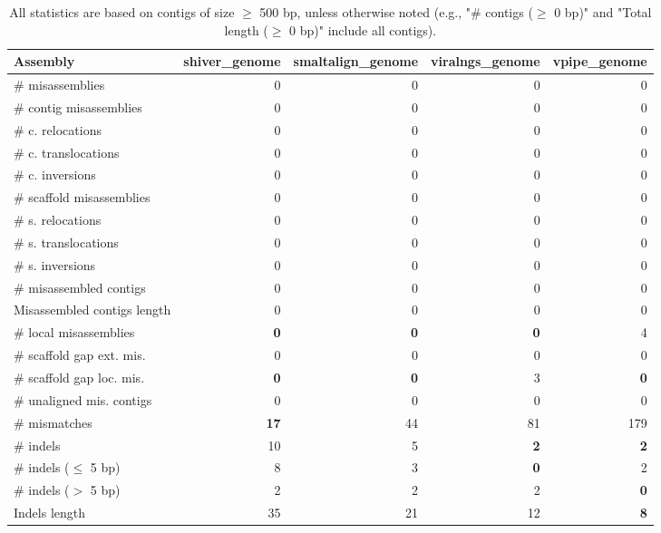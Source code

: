 \documentclass[12pt,a4paper]{article}
\begin{document}
\begin{table}[ht]
\begin{center}
\caption{All statistics are based on contigs of size $\geq$ 500 bp, unless otherwise noted (e.g., "\# contigs ($\geq$ 0 bp)" and "Total length ($\geq$ 0 bp)" include all contigs).}
\begin{tabular}{|l*{4}{|r}|}
\hline
Assembly & shiver\_genome & smaltalign\_genome & viralngs\_genome & vpipe\_genome \\ \hline
\# misassemblies & 0 & 0 & 0 & 0 \\ \hline
\hspace{2mm}\# contig misassemblies & 0 & 0 & 0 & 0 \\ \hline
\hspace{5mm}\# c. relocations & 0 & 0 & 0 & 0 \\ \hline
\hspace{5mm}\# c. translocations & 0 & 0 & 0 & 0 \\ \hline
\hspace{5mm}\# c. inversions & 0 & 0 & 0 & 0 \\ \hline
\hspace{2mm}\# scaffold misassemblies & 0 & 0 & 0 & 0 \\ \hline
\hspace{5mm}\# s. relocations & 0 & 0 & 0 & 0 \\ \hline
\hspace{5mm}\# s. translocations & 0 & 0 & 0 & 0 \\ \hline
\hspace{5mm}\# s. inversions & 0 & 0 & 0 & 0 \\ \hline
\# misassembled contigs & 0 & 0 & 0 & 0 \\ \hline
Misassembled contigs length & 0 & 0 & 0 & 0 \\ \hline
\# local misassemblies & {\bf 0} & {\bf 0} & {\bf 0} & 4 \\ \hline
\# scaffold gap ext. mis. & 0 & 0 & 0 & 0 \\ \hline
\# scaffold gap loc. mis. & {\bf 0} & {\bf 0} & 3 & {\bf 0} \\ \hline
\# unaligned mis. contigs & 0 & 0 & 0 & 0 \\ \hline
\# mismatches & {\bf 17} & 44 & 81 & 179 \\ \hline
\# indels & 10 & 5 & {\bf 2} & {\bf 2} \\ \hline
\hspace{5mm}\# indels ($\leq$ 5 bp) & 8 & 3 & {\bf 0} & 2 \\ \hline
\hspace{5mm}\# indels ($>$ 5 bp) & 2 & 2 & 2 & {\bf 0} \\ \hline
Indels length & 35 & 21 & 12 & {\bf 8} \\ \hline
\end{tabular}
\end{center}
\end{table}
\end{document}
